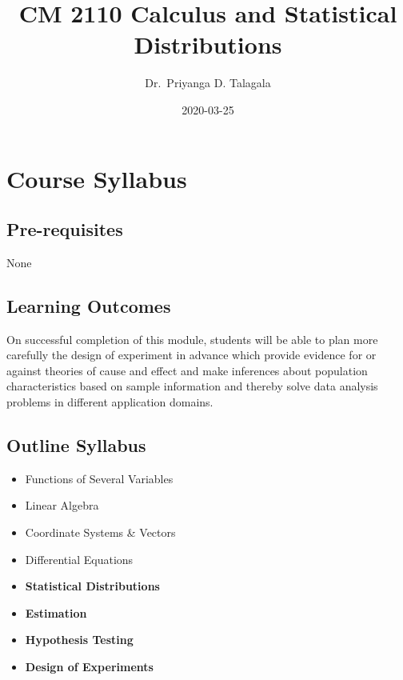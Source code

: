\documentclass[]{book}
\title{CM 2110 Calculus and Statistical Distributions}
\author{Dr.~Priyanga D. Talagala}
\date{2020-03-25}
\providecommand{\tightlist}{%
  \setlength{\itemsep}{0pt}\setlength{\parskip}{0pt}}
\begin{document}
\maketitle

{
\setcounter{tocdepth}{1}
\tableofcontents
}
\hypertarget{course-syllabus}{%
\chapter*{Course Syllabus}\label{course-syllabus}}

\hypertarget{pre-requisites}{%
\section*{Pre-requisites}\label{pre-requisites}}

None

\hypertarget{learning-outcomes}{%
\section*{Learning Outcomes}\label{learning-outcomes}}

On successful completion of this module, students will be able to plan more carefully the design of experiment in advance which provide evidence for or against theories of cause and effect and make inferences about population characteristics based on sample information and thereby solve data analysis problems in different application domains.

\hypertarget{outline-syllabus}{%
\section*{Outline Syllabus}\label{outline-syllabus}}

\begin{itemize}
\tightlist
\item
  Functions of Several Variables
\item
  Linear Algebra
\item
  Coordinate Systems \& Vectors
\item
  Differential Equations
\item
  \textbf{Statistical Distributions}
\item
  \textbf{Estimation}
\item
  \textbf{Hypothesis Testing}
\item
  \textbf{Design of Experiments}
\end{itemize}
\end{document}
